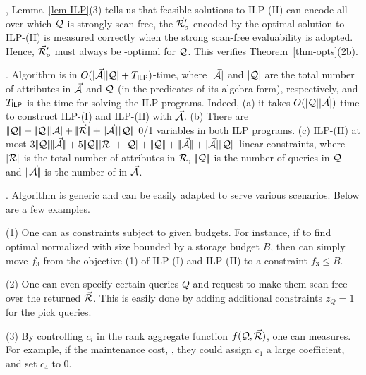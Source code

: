 \vspace{0.6ex}
, 
Lemma~\ref{lem-ILP}(3) tells us that feasible solutions to
ILP-(II) can encode all \bdss over which $\mathcal Q$ is strongly
scan-free, \ie the \bds $\vec{{\mathcal R}}_{o}'$ encoded by the optimal
solution to ILP-(II) is measured correctly
when the strong scan-free evaluability is
adopted. Hence, $\vec{{\mathcal R}}_{o}'$ must always be \ssf-optimal for
$\mathcal Q$. This verifies Theorem~\ref{thm-opts}(2b). \eop


. Algorithm \opts is in
$O(|{\vec{{\mathcal A}}}||{\mathcal Q}| + T_{\protect\mathsf{ILP}} )$-time, where
$|{\vec{{\mathcal A}}}|$ and $|{\mathcal Q}|$ are the total number of attributes
in $\vec{{\mathcal A}}$ and $\mathcal Q$ (in the predicates of its algebra form),
respectively, and $T_{\protect\mathsf{ILP}}$ is the time for solving the ILP programs. 
Indeed, %
(a) it takes $O(|{\mathcal Q}||{\vec{{\mathcal A}}}|)$ time to construct ILP-(I) and
ILP-(II) with $\vec{{\mathcal A}}$.
(b) There are $\cdd{\Q} + \cdd{\Q}\cd{\A} + \cdd{\kb{\R}} + \cdd{\kb{\A}}\cdd{\Q}$ 0/1
variables in both ILP programs.
(c) ILP-(II)  at most
$3\cdd{\Q}\cdd{\kb{\A}} + 5\cdd{\Q}\cd{\R} + \cd{\Q} +
\cdd{\Q} + \cdd{\kb{\A}} + \cd{\kb{\A}}\cdd{\Q}$ linear
constraints, where $|{{\mathcal R}}|$ is the total number of attributes in
${\mathcal R}$, $|\!|{\mathcal Q}|\!|$ is the number of queries in $\mathcal Q$ and
$|\!|{\vec{{\mathcal A}}}|\!|$ is the number of \bss in $\vec{{\mathcal A}}$. 



. Algorithm \opts is generic and can be easily
adapted to serve various scenarios. Below are a few examples.

\sstab (1) One can 
as constraints subject to given budgets. For instance, if  to find optimal normalized \bds with size bounded by a
storage budget $B$, then  can simply move $f_{3}$ from the
objective (1) of ILP-(I) and ILP-(II) to a constraint 
$f_{3}\leq B$.

\sstab (2) One can even specify certain queries $Q$ and request
to make them scan-free over the returned \bds $\vec{{\mathcal R}}$. This is
easily done by adding additional constraints $z_{Q} = 1$
for the pick queries.

\sstab (3) By controlling $c_{i}$ in the rank aggregate function
$f(\mathcal Q, \vec{{\mathcal R}})$, one can 
measures. For example, if 
the maintenance cost, ,
they could assign $c_{1}$ a
  large coefficient, %
  and set $c_{4}$
to 0.

